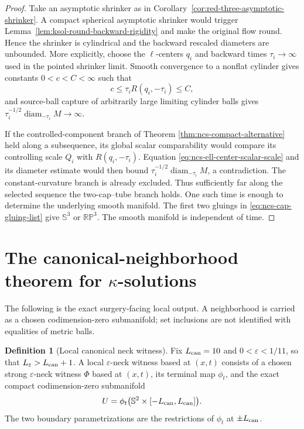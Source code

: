 \documentclass[10pt]{coll-l}
\newcommand{\Sph}{\mathbb{S}}
\theoremstyle{definition}
\newtheorem{definition}[theorem]{Definition}
\theoremstyle{remark}
\numberwithin{section}{chapter}
\numberwithin{equation}{chapter}
\begin{document}
\begin{proof}
Take an asymptotic shrinker as in
Corollary~\ref{cor:red-three-asymptotic-shrinker}.  A compact spherical
asymptotic shrinker would trigger
Lemma~\ref{lem:ksol-round-backward-rigidity} and make the original flow
round.  Hence the shrinker is cylindrical and the backward rescaled
diameters are unbounded.  More explicitly, choose the $\ell$-centers
$q_i$ and backward times $\tau_i\to\infty$ used in the pointed shrinker
limit.  Smooth convergence to a nonflat cylinder gives constants
$0<c<C<\infty$ such that
\begin{equation}
             c\leq\tau_iR(q_i,-\tau_i)\leq C,         \label{eq:ncs-ell-center-scalar-scale}
\end{equation}
and source-ball capture of arbitrarily large limiting cylinder balls gives
$\tau_i^{-1/2}\operatorname{diam}_{-\tau_i}M\to\infty$.

If the controlled-component branch of Theorem
\ref{thm:ncs-compact-alternative} held along a subsequence, its global
scalar comparability would compare its controlling scale $Q_i$ with
$R(q_i,-\tau_i)$.  Equation
\eqref{eq:ncs-ell-center-scalar-scale} and its diameter estimate would then
bound $\tau_i^{-1/2}\operatorname{diam}_{-\tau_i}M$, a contradiction.
The constant-curvature branch is already excluded.  Thus sufficiently far
along the selected sequence the two-cap--tube branch holds.  One such time
is enough to determine the underlying smooth manifold.  The first two gluings in
\eqref{eq:ncs-cap-gluing-list} give $\Sph^3$ or $\mathbb{RP}^3$.  The
smooth manifold is independent of time.
\end{proof}

\section{The canonical-neighborhood theorem for $\kappa$-solutions}
\label{sec:ncs-canonical-neighborhood}

The following is the exact surgery-facing local output.  A neighborhood is
carried as a chosen codimension-zero submanifold; set inclusions are not
identified with equalities of metric balls.

\begin{definition}[Local canonical neck witness]
\label{def:ncs-local-canonical-neck}
Fix $L_{\rm can}=10$ and $0<\varepsilon<1/11$, so that
$L_\varepsilon>L_{\rm can}+1$.  A local $\varepsilon$-neck witness based at $(x,t)$
consists of a chosen strong $\varepsilon$-neck witness $\Phi$ based at
$(x,t)$, its terminal map $\phi_t$, and the exact compact
codimension-zero submanifold
\begin{equation}
 U=\phi_t\bigl(\Sph^2\times[-L_{\rm can},L_{\rm can}]\bigr).    \label{eq:ncs-local-neck-region}
\end{equation}
The two boundary parametrizations are the restrictions of $\phi_t$ at
$\pm L_{\rm can}$.
\end{definition}
\end{document}
